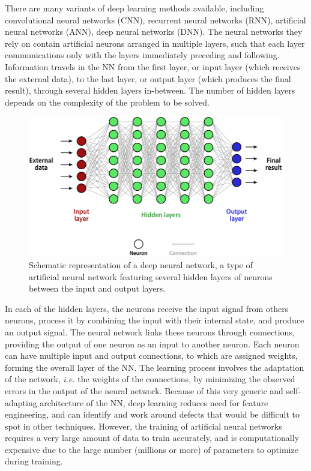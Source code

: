 \documentclass[aip,apm,amsmath,amssymb,reprint]{revtex4-2}
\begin{document}
There are many variants of deep learning methods available, including convolutional neural networks (CNN), recurrent neural networks (RNN), artificial neural networks (ANN), deep neural networks (DNN). The neural networks they rely on contain  artificial neurons arranged in multiple layers, such that each layer communications only with the layers immediately preceding and following. Information travels in the NN from the first layer, or input layer (which receives the external data), to the last layer, or output layer (which produces the final result), through several hidden layers in-between. The number of hidden layers depends on the complexity of the problem to be solved. 

\begin{figure}[t]
\includegraphics[width=125mm]{neural_network}
\caption{\label{fig:neural_network} Schematic representation of a deep neural network, a type of artificial neural network featuring several hidden layers of neurons between the input and output layers.}
\end{figure}

In each of the hidden layers, the neurons receive the input signal from others neurons, process it by combining the input with their internal state, and produce an output signal. The neural network links these neurons through connections, providing the output of one neuron as an input to another neuron. Each neuron can have multiple input and output connections, to which are assigned weights, forming the overall layer of the NN. The learning process involves the adaptation of the network, \emph{i.e.} the weights of the connections, by minimizing the observed errors in the output of the neural network. Because of this very generic and self-adapting architecture of the NN, deep learning reduces need for feature engineering, and can identify and work around defects that would be difficult to spot in other techniques. However, the training of artificial neural networks requires a very large amount of data to train accurately, and is computationally expensive due to the large number (millions or more) of parameters to optimize during training.
\end{document}
